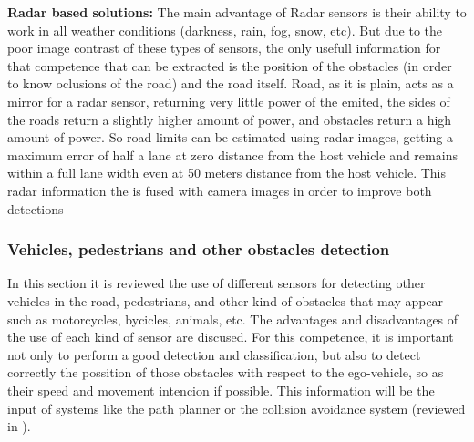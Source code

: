 \textbf{Radar based solutions:}
The main advantage of Radar sensors is their ability to work in all weather conditions (darkness, rain, fog, snow, etc). But due to the poor image contrast of these types of sensors, the only usefull information for that competence that can be extracted is the position of the obstacles (in order to know oclusions of the road) and the road itself. Road, as it is plain, acts as a mirror for a radar sensor, returning very little power of the emited, the sides of the roads return a slightly higher amount of power, and obstacles return a high amount of power. So road limits can be estimated using radar images, getting a maximum error of half a lane at zero distance from the host vehicle and remains within a full lane width even at 50 meters distance from the host vehicle. This radar information the is fused with camera images in order to improve both detections \cite{kaliyaperumal2001algorithm, ma2000simultaneous, Janda2013}

\subsubsection{Vehicles, pedestrians and other obstacles detection}
In this section it is reviewed the use of different sensors for detecting other vehicles in the road, pedestrians, and other kind of obstacles that may appear such as motorcycles, bycicles, animals, etc. The advantages and disadvantages of the use of each kind of sensor are discused. For this competence, it is important not only to perform a good detection and classification, but also to detect correctly the possition of those obstacles with respect to the ego-vehicle, so as their speed  and movement intencion if possible. This information will be the input of systems like the path planner or the collision avoidance system (reviewed in \cite{mukhtar2015vehicle}).


